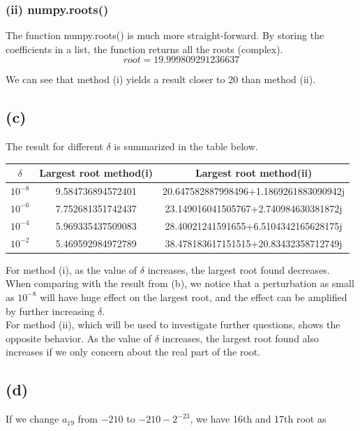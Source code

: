 \documentclass[a4paper, 12pt]{article}
\begin{document}
\subsubsection*{(ii) numpy.roots()}

The function numpy.roots() is much more straight-forward. By storing the coefficients in a list, the function returns all the roots (complex).
\[root = 19.999809291236637\]

We can see that method (i) yields a result closer to 20 than method (ii).

\subsection*{(c)}

The result for different $\delta$ is summarized in the table below.

\begin{table}[H]
\centering
\begin{tabular}{|c|c|c|}
\hline
\textbf{$\delta$} & \textbf{Largest root method(i)} & \textbf{Largest root method(ii)} \\ \hline
$10^{-8}$     & 9.584736894572401  & 20.647582887998496+1.1869261883090942j\\ \hline
$10^{-6}$     & 7.752681351742437 & 23.149016041505767+2.740984630381872j\\ \hline
$10^{-4}$     & 5.969335437509083 & 28.40021241591655+6.5104342165628175j\\ \hline
$10^{-2}$     & 5.469592984972789 & 38.478183617151515+20.83432358712749j\\ \hline
\end{tabular}
\end{table}

For method (i), as the value of $\delta$ increases, the largest root found decreases. When comparing with the result from (b), we notice that a perturbation as small as $10^{-8}$ will have huge effect on the largest root, and the effect can be amplified by further increasing $\delta$.\\

For method (ii), which will be used to investigate further questions, shows the opposite behavior. As the value of $\delta$ increases, the largest root found also increases if we only concern about the real part of the root.

\subsection*{(d)}
If we change $a_{19}$ from $-210$ to $-210-2^{-23}$, we have 16th and 17th root as
\end{document}

